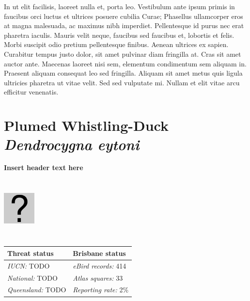 \documentclass[12pt,openany,oneside]{book}
\let\origfigure\figure
\let\endorigfigure\endfigure
\renewenvironment{figure}[1][2] {
  \expandafter\origfigure\expandafter[H]
} {
  \endorigfigure
}
\theoremstyle{definition}
\theoremstyle{definition}
\theoremstyle{definition}
\theoremstyle{remark}
\begin{document}
In ut elit facilisis, laoreet nulla et, porta leo. Vestibulum ante ipsum
primis in faucibus orci luctus et ultrices posuere cubilia Curae;
Phasellus ullamcorper eros at magna malesuada, ac maximus nibh
imperdiet. Pellentesque id purus nec erat pharetra iaculis. Mauris velit
neque, faucibus sed faucibus et, lobortis et felis. Morbi suscipit odio
pretium pellentesque finibus. Aenean ultrices ex sapien. Curabitur
tempus justo dolor, sit amet pulvinar diam fringilla at. Cras sit amet
auctor ante. Maecenas laoreet nisi sem, elementum condimentum sem
aliquam in. Praesent aliquam consequat leo sed fringilla. Aliquam sit
amet metus quis ligula ultricies pharetra ut vitae velit. Sed sed
vulputate mi. Nullam et elit vitae arcu efficitur venenatis.

\clearpage

\hypertarget{plumed-whistling-duck-dendrocygna-eytoni}{%
\section{\texorpdfstring{Plumed Whistling-Duck \emph{Dendrocygna
eytoni}}{Plumed Whistling-Duck Dendrocygna eytoni}}\label{plumed-whistling-duck-dendrocygna-eytoni}}


\textbf{Insert header text here}

\begin{figure}
\centering
\includegraphics[width=63px,height=120px]{assets/profile/missing.png}
\caption{Insert caption here.}
\end{figure}

\begin{tabu} to 
\toprule
Threat status & Brisbane status\\
\midrule
\textit{IUCN:} TODO & \textit{eBird records:} 414\\
\textit{National:} TODO & \textit{Atlas squares:} 33\\
\textit{Queensland:} TODO & \textit{Reporting rate:} 2\%\\
\bottomrule
\end{tabu}
\end{document}
